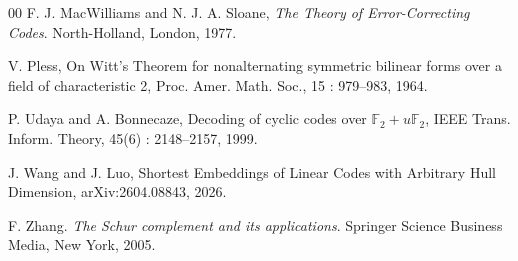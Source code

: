 \documentclass{article}
\theoremstyle{definition}
\theoremstyle{remark}
\begin{document}
\begin{thebibliography}{00}
 F. J. MacWilliams and N. J. A. Sloane, {\it The Theory of Error-Correcting Codes}. North-Holland, London, 1977.

 V. Pless, On Witt's Theorem for nonalternating symmetric bilinear forms over a field of characteristic 2, Proc. Amer. Math. Soc., 15 : 979--983, 1964.

 P. Udaya and A. Bonnecaze, Decoding of cyclic codes over $\mathbb{F}_2+u\mathbb{F}_2$, IEEE Trans. Inform. Theory, 45(6) : 2148--2157, 1999.

 J. Wang and J. Luo, Shortest Embeddings of Linear Codes with Arbitrary Hull Dimension, arXiv:2604.08843, 2026.

 F. Zhang. \emph{The Schur complement and its applications}. Springer Science Business Media, New York, 2005.
\end{thebibliography}
\end{document}

